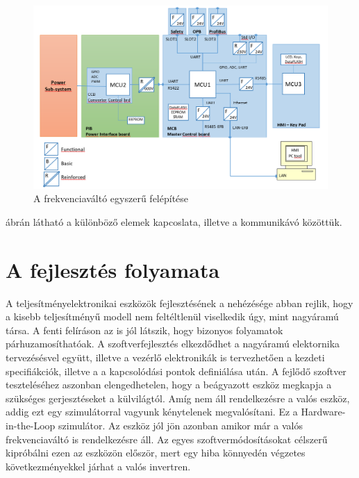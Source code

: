 
\begin{figure}[h]
	\centering
	\includegraphics[width = \textwidth]{figures/architect.png}
	\caption{A frekvenciaváltó egyszerű felépítése} 
	\label{fig:hw_architect}
\end{figure}

 ábrán látható a különböző elemek kapcoslata, illetve a kommunikávó közöttük.

\section{A fejlesztés folyamata}

A teljesítményelektronikai eszközök fejlesztésének a nehézésége abban rejlik, hogy a kisebb teljesítményű modell nem feltéltlenül viselkedik úgy, mint nagyáramú társa. A fenti felíráson az is jól látszik, hogy bizonyos folyamatok párhuzamosíthatóak. A szoftverfejlesztés elkezdődhet a nagyáramú elektornika tervezésésvel együtt, illetve a vezérlő elektronikák is tervezhetően a kezdeti specifiákciók, illetve a a kapcsolódási pontok definiálása után. A fejlődő szoftver teszteléséhez aszonban elengedhetelen, hogy a beágyazott eszköz megkapja a szükséges gerjesztéseket a külvilágtól. Amíg nem áll rendelkezésre a valós eszköz, addig ezt egy szimulátorral vagyunk kénytelenek megvalósítani. Ez a Hardware-in-the-Loop szimulátor. Az eszköz jól jön azonban amikor már a valós frekvenciaváltó is rendelkezésre áll. Az egyes szoftvermódosításokat célszerű kipróbálni ezen az eszközön először, mert egy hiba könnyedén végzetes következményekkel járhat a valós invertren.
